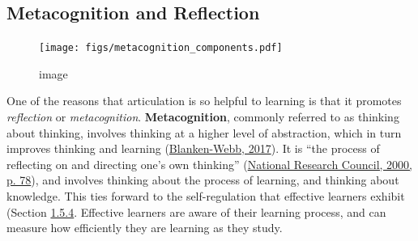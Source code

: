 \documentclass[a4paper, nobind]{templates/ociamthesis}
\begin{document}
\hypertarget{sec:bg_learn_metacognition}{%
\subsection{Metacognition and Reflection}\label{sec:bg_learn_metacognition}}

\begin{figure}
\centering
\texttt{[image: figs/metacognition\_components.pdf]}
\caption{image}
\end{figure}

One of the reasons that articulation is so helpful to learning is that
it promotes \emph{reflection} or \emph{metacognition}. \textbf{Metacognition}, commonly
referred to as thinking about thinking, involves thinking at a higher
level of abstraction, which in turn improves thinking and learning
(\protect\hyperlink{ref-blanken2017metacognition}{Blanken-Webb, 2017}). It is ``the process of reflecting on and
directing one's own thinking'' (\protect\hyperlink{ref-council2000how}{National Research Council, 2000, p. 78}), and involves
thinking about the process of learning, and thinking about knowledge.
This ties forward to the self-regulation that effective learners exhibit
(Section \protect\hyperlink{sec:bg_learn_self_regulation}{1.5.4}. Effective learners are aware
of their learning process, and can measure how efficiently they are
learning as they study.
\end{document}
